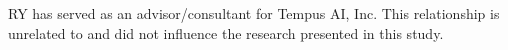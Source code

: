 \documentclass[pdflatex,sn-nature]{sn-jnl}%
\theoremstyle{thmstyleone}%
\theoremstyle{thmstyletwo}%
\theoremstyle{thmstylethree}%
\begin{document}

RY has served as an advisor/consultant for Tempus AI, Inc. This relationship is unrelated to and did not influence the research presented in this study.


%

\begin{appendices}

	\printglossaries



\end{appendices}
\end{document}
